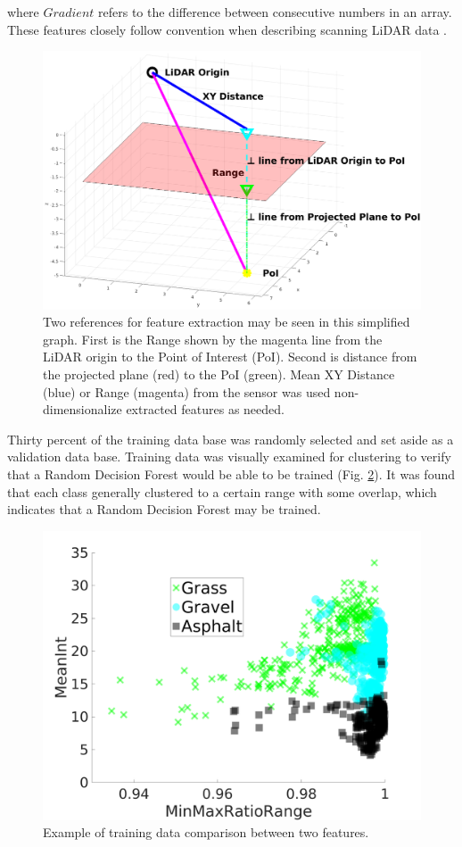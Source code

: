 \documentclass[numbered,pdftex]{ohio-etd}
\begin{document}
{{{{				{where $Gradient$ refers to the difference between consecutive numbers in an array. These features closely follow convention when describing scanning LiDAR data \cite{breiman_random_2001}.}
				
				
				\begin{figure}[H]
					\centering
					\includegraphics[width=1\linewidth]{Defense_Images/xy_vs_range}
					\caption[XY vs Range vs Z Height]{Two references for feature extraction may be seen in this simplified graph. First is the Range shown by the magenta line from the LiDAR origin to the Point of Interest (PoI). Second is distance from the projected plane (red) to the PoI (green). Mean XY Distance (blue) or Range (magenta) from the sensor was used non-dimensionalize extracted features as needed.}
					\label{fig:xy_vs_range}
				\end{figure}
			
				{Thirty percent of the training data base was randomly selected and set aside as a validation data base. Training data was visually examined for clustering to verify that a Random Decision Forest would be able to be trained (Fig. \ref{fig:range_training_data_cluster_3}). It was found that each class generally clustered to a certain range with some overlap, which indicates that a Random Decision Forest may be trained.}
				
				\begin{figure}[H]
					\centering
					\includegraphics[width=0.75\linewidth]{Defense_Images/training_data_cluster_3}
					\caption[Example Clustering]{Example of training data comparison between two features.}
					\label{fig:range_training_data_cluster_3}
				\end{figure}
				
}}}}
\end{document}
